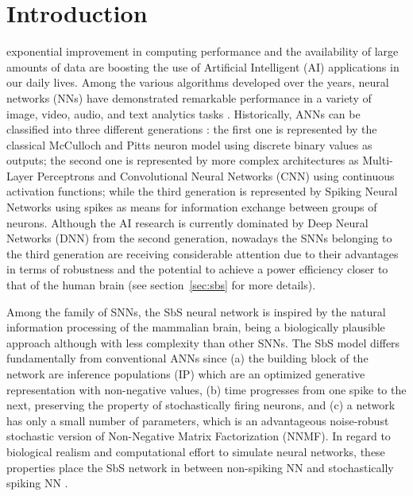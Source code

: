
\section{Introduction}
\label{sec:introduction}
 exponential improvement in computing performance and the availability of large amounts of data are boosting the use of Artificial Intelligent (AI) applications in our daily lives. Among the various algorithms developed over the years, neural networks (NNs) have demonstrated remarkable performance in a variety of image, video, audio, and text analytics tasks \cite{schmidhuber2015deep,Taigman_2014_CVPR}. Historically, ANNs can be classified into three different generations \cite{Design_Exploration_SbS_Trans20}: the first one is represented by the classical McCulloch and Pitts neuron model using discrete binary values as outputs; the second one is represented by more complex architectures as Multi-Layer Perceptrons and Convolutional Neural Networks (CNN) using continuous activation functions; while the third generation is represented by Spiking Neural Networks using spikes as means for information exchange between groups of neurons. Although the AI research is currently dominated by Deep Neural Networks (DNN) from the second generation, nowadays the SNNs belonging to the third generation are receiving considerable attention \cite{Spinnaker_Trans13,ernst2007efficient,Design_Exploration_SbS_Trans20, SNN_Survey_Trans19} due to their advantages in terms of robustness and the potential to achieve a power efficiency closer to that of the human brain (see section~\ref{sec:sbs} for more details).

Among the family of SNNs, the SbS neural network \cite{ernst2007efficient} is inspired by the natural information processing of the mammalian brain, being a biologically plausible approach although with less complexity than other SNNs. The SbS model differs fundamentally from conventional ANNs since (a) the building block of the network are inference populations (IP) which are an optimized generative representation with non-negative values, (b) time progresses from one spike to the next, preserving the property of stochastically firing neurons, and (c) a network has only a small number of parameters, which is an advantageous noise-robust stochastic version of Non-Negative Matrix Factorization (NNMF). In regard to biological realism and computational effort to simulate neural networks, these properties place the SbS network in between non-spiking NN and stochastically spiking NN \cite{rotermund2019Backpropagation}.



